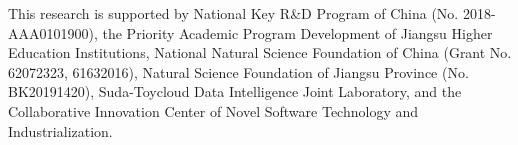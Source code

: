 \begin{acks}
This research is supported by National Key R\&D Program of China (No. 2018-AAA0101900), the Priority Academic Program Development of Jiangsu Higher Education Institutions, National Natural Science Foundation of China (Grant No. 62072323, 61632016), Natural Science Foundation of Jiangsu Province (No. BK20191420), Suda-Toycloud Data Intelligence Joint Laboratory, and the Collaborative Innovation Center of Novel Software Technology and Industrialization.
\end{acks}

\balance

